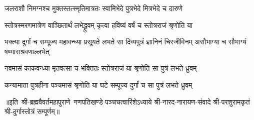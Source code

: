 \twolineshloka
{जलराशौ निमग्नश्च मुक्तस्तत्स्मृतिमात्रतः}
{स्वामिभेदे पुत्रभेदे मित्रभेदे च दारुणे}

\twolineshloka
{स्तोत्रस्मरणमात्रेण वाञ्छितार्थं लभेद्ध्रुवम्}
{कृत्वा हविष्यं वर्षं च स्तोत्रराजं श्रृणोति या}

\threelineshloka
{भक्त्या दुर्गां च सम्पूज्य महावन्ध्या प्रसूयते}
{लभते सा दिव्यपुत्रं ज्ञानिनं चिरजीविनम्}
{असौभाग्या च सौभाग्यं षण्मासश्रवणाल्लभेत्}

\twolineshloka
{नवमासं काकवन्ध्या मृतवत्सा च भक्तितः}
{स्तोत्रराजं या श्रृणोति सा पुत्रं लभते ध्रुवम्}

\twolineshloka
{कन्यामाता पुत्रहीना पञ्चमासं श्रृणोति या}
{घटे सम्पूज्य दुर्गां च सा पुत्रं लभते ध्रुवम्}


{॥इति~श्री-ब्रह्मवैवर्तमहापुराणे~गणपतिखण्डे पञ्चचत्वारिंशेऽध्याये श्री-नारद-नारायण-संवादे श्री-परशुरामकृतं श्री-दुर्गास्तोत्रं सम्पूर्णम्॥}